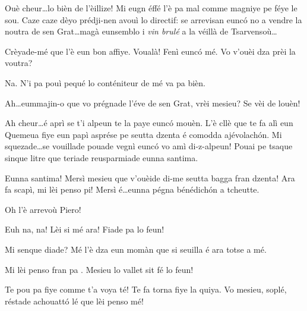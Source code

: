 \begin{drama}
\Pierluigispeaks Ouè cheur\ldots lo bièn de l'èillize! Mi eugn éffé l'è pa mal comme magniye pe féye le sou. Caze caze dèyo prédji-nen avouì lo directif: se arrevisan eunc\'o no a vendre la noutra de sen Grat\ldots magà eunsemblo i \textit{vin brulé} a la véillà de Tsarvensoù\ldots

\Seurspeaks Crèyade-mé que l'è eun bon affiye. Voualà! Fenì eunc\'o mé. Vo v'ouèi dza prèi la voutra?

\Pierluigispeaks Na. N'i pa pouì pequé lo conténiteur de mé  va pa bièn.

\Seurspeaks Ah\ldots eummajin-o que vo prégnade l'éve de sen Grat, vrèi mesieu? Se vèi de louèn!

\Pierluigispeaks Ah cheur\ldots é aprì se t'i alpeun te la paye eunc\'o mouèn. L'è cllè que te fa alì eun Quemeua fiye eun papì asprése pe seutta dzenta é comodda ajévolach\'on. Mi squezade\ldots se vou\-illa\-de poua\-de vegnì eunc\'o vo amì di-z-alpeun! Pouai pe tsaque sinque litre que teriade reusparmiade eunna santima.

\Seurspeaks{}  Eunna santima! Mersì mesieu que v'ouèide di-me seutta bagga fran dzenta! Ara fa scapì, mi lèi penso pi! Mersì é\ldots eunna pégna bénédich\'on a tcheutte.


\scene[-- Prospero]


\Pierluigispeaks{} Oh l'è arrevoù Piero!


\Prosperospeaks{} Euh na, na! Lèi si mé ara! Fiade pa lo feun!

\Pierluigispeaks Mi senque diade? Mé l'è dza eun momàn que si seuilla é ara totse a mé.

\Prosperospeaks Mi lèi penso fran pa \arrabbiato. Mesieu lo vallet sit fé lo feun!


\Valletspeaks {} Te pou pa fiye comme t'a voya té! Te fa torna fiye la quiya.  Vo mesieu, soplé, réstade achouatt\'o lé que lèi penso mé!


\end{drama}
